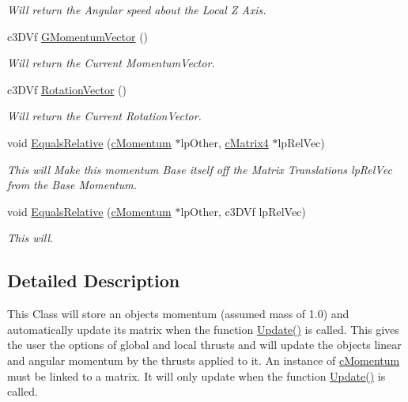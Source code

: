 \begin{DoxyCompactItemize}
\begin{DoxyCompactList}\small\item\em Will return the Angular speed about the Local Z Axis. \end{DoxyCompactList}\item 
\hypertarget{classc_momentum_a7862ced21b7c6732bc37638d166c5bda}{
c3DVf \hyperlink{classc_momentum_a7862ced21b7c6732bc37638d166c5bda}{GMomentumVector} ()}
\label{classc_momentum_a7862ced21b7c6732bc37638d166c5bda}

\begin{DoxyCompactList}\small\item\em Will return the Current MomentumVector. \end{DoxyCompactList}\item 
\hypertarget{classc_momentum_a39db7d06be015d5c2d42fd6ca3092857}{
c3DVf \hyperlink{classc_momentum_a39db7d06be015d5c2d42fd6ca3092857}{RotationVector} ()}
\label{classc_momentum_a39db7d06be015d5c2d42fd6ca3092857}

\begin{DoxyCompactList}\small\item\em Will return the Current RotationVector. \end{DoxyCompactList}\item 
\hypertarget{classc_momentum_a311a4552715fb147b96cfcefacc939e4}{
void \hyperlink{classc_momentum_a311a4552715fb147b96cfcefacc939e4}{EqualsRelative} (\hyperlink{classc_momentum}{cMomentum} $\ast$lpOther, \hyperlink{classc_matrix4}{cMatrix4} $\ast$lpRelVec)}
\label{classc_momentum_a311a4552715fb147b96cfcefacc939e4}

\begin{DoxyCompactList}\small\item\em This will Make this momentum Base itself off the Matrix Translations lpRelVec from the Base Momentum. \end{DoxyCompactList}\item 
\hypertarget{classc_momentum_ad7c006b17a0f51bf910ba4969e2f67e4}{
void \hyperlink{classc_momentum_ad7c006b17a0f51bf910ba4969e2f67e4}{EqualsRelative} (\hyperlink{classc_momentum}{cMomentum} $\ast$lpOther, c3DVf lpRelVec)}
\label{classc_momentum_ad7c006b17a0f51bf910ba4969e2f67e4}

\begin{DoxyCompactList}\small\item\em This will. \end{DoxyCompactList}\end{DoxyCompactItemize}


\subsection{Detailed Description}
This Class will store an objects momentum (assumed mass of 1.0) and automatically update its matrix when the function \hyperlink{classc_momentum_ae860280e817e7afef71222afd0b12ec8}{Update()} is called. This gives the user the options of global and local thrusts and will update the objects linear and angular momentum by the thrusts applied to it. An instance of \hyperlink{classc_momentum}{cMomentum} must be linked to a matrix. It will only update when the function \hyperlink{classc_momentum_ae860280e817e7afef71222afd0b12ec8}{Update()} is called. 